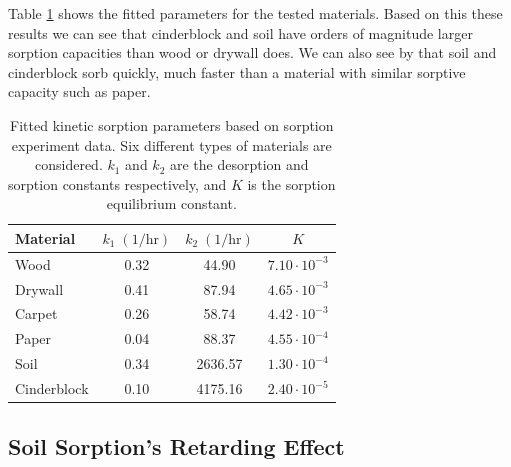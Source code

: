 Table \ref{tbl:sorption_fit} shows the fitted parameters for the tested materials.
Based on this these results we can see that cinderblock and soil have orders of magnitude larger sorption capacities than wood or drywall does.
We can also see by that soil and cinderblock sorb quickly, much faster than a material with similar sorptive capacity such as paper.\par

\begin{table}[htb!]
  \caption{Fitted kinetic sorption parameters based on sorption experiment data. Six different types of materials are considered. $k_1$ and $k_2$ are the desorption and sorption constants respectively, and $K$ is the sorption equilibrium constant.}
  \label{tbl:sorption_fit}
  \centering
  \begin{tabular}{l c c c}
    \toprule
    Material & $k_1 \; \mathrm{(1/hr)}$ & $k_2 \; \mathrm{(1/hr)}$ & $K$ \\
    \hline
    Wood & 0.32 & 44.90 & $7.10 \cdot 10^{-3}$ \\
    Drywall & 0.41 & 87.94 & $4.65 \cdot 10^{-3}$ \\
    Carpet & 0.26 & 58.74 & $4.42 \cdot 10^{-3}$ \\
    Paper & 0.04 & 88.37 & $4.55 \cdot 10^{-4}$ \\
    Soil & 0.34 & 2636.57 & $1.30 \cdot 10^{-4}$ \\
    Cinderblock & 0.10 & 4175.16 & $2.40 \cdot 10^{-5}$ \\
    \bottomrule
  \end{tabular}
\end{table}

\subsection{Soil Sorption's Retarding Effect}\label{sec:retardation_effect}

